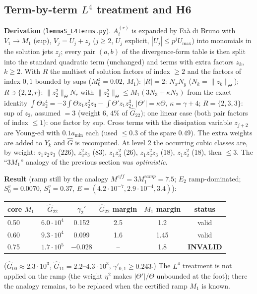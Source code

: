 \documentclass[11pt]{article}
\begin{document}
\subsection*{Term-by-term $L^4$ treatment and H6}
\textbf{Derivation} (\texttt{lemmaS\_L4terms.py}). $A_i^{(r)}$ is expanded by Fa\`a di Bruno with $V_1\to M_1$ (sup), $V_j=U_j+z_j$ ($j\ge2$, $U_j$ explicit, $|U_j|\le p^jU_{\max}$) into monomials in the solution jets $z_j$; every pair $(a,b)$ of the divergence-form table is then split into the standard quadratic term (unchanged) and terms with extra factors $z_k$, $k\ge2$. With $R$ the multiset of solution factors of index $\ge2$ and the factors of index $0,1$ bounded by sups ($M_0^z=0.02$, $M_1$): $|R|=2$: $N_xN_y$ ($N_k=\|z_k\|_\Theta$); $R\ni\{2,2,r\}$: $\|z_2^2\|_\Theta N_r$ with $\|z_2^2\|_\Theta\le M_1(3N_3+\kappa N_2)$ from the exact identity $\int\Theta z_2^4=-3\int\Theta z_1z_2^2z_3-\int\Theta'z_1z_2^3$, $|\Theta'|=\kappa\Theta$, $\kappa=\gamma+4$; $R=\{2,3,3\}$: sup of $z_2$, assumed $=3$ (weight $6$, $4\%$ of $\hat G_{22}$); one linear case (both pair factors of index $\le1$): one factor by sup. Cross terms with the dissipation variable $z_{j+2}$ are Young-ed with $0.1a_{\min}$ each (used $\le0.3$ of the spare $0.49$). The extra weights are added to $Y_k$ and $\hat G$ is recomputed. At level 2 the occurring cubic classes are, by weight: $z_1z_2z_3$ (226), $z_2^2z_3$ (83), $z_1z_3^2$ (26), $z_1z_2^2z_3$ (18), $z_1z_2^2$ (18), then $\le3$. The ``$3M_1$'' analogy of the previous section was \emph{optimistic}.

\textbf{Result} (ramp still by the analogy $M^{eff}=3M_1^{ramp}=7.5$; $E_2$ ramp-dominated; $S_0^v=0.0070$, $S_1^v=0.37$, $E=(4.2\cdot10^{-7},2.9\cdot10^{-4},3.4)$):
\begin{center}\begin{tabular}{lccccc}
core $M_1$ & $\hat G_{22}$ & $\gamma_2'$ & $\hat G_{22}$ margin & $M_1$ margin & status\\\hline
0.50 & $6.0\cdot10^4$ & 0.152 & 2.5 & 1.2 & valid\\
0.60 & $9.3\cdot10^4$ & 0.099 & 1.6 & 1.45 & valid\\
0.75 & $1.7\cdot10^5$ & $-0.028$ & -- & 1.8 & \textbf{INVALID}
\end{tabular}\end{center}
($\hat G_{00}\approx2.3\cdot10^3$, $\hat G_{11}=2.2$--$4.3\cdot10^3$, $\gamma'_{0,1}\ge0.243$.) The $L^4$ treatment is not applied on the ramp (the weight $\eta^2$ makes $|\Theta'|/\Theta$ unbounded at the foot); there the analogy remains, to be replaced when the certified ramp $M_1$ is known.
\end{document}
